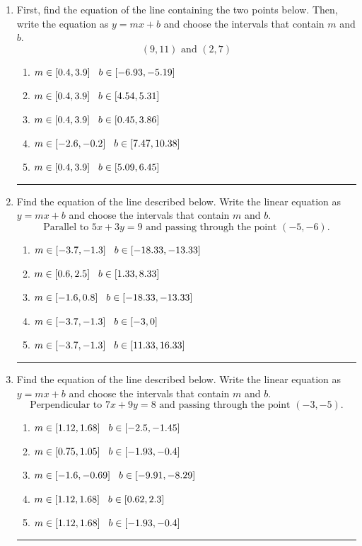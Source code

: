\documentclass[14pt]{extbook}
\newcommand{\litem}[1]{\item#1\hspace*{-1cm}\rule{\textwidth}{0.4pt}}
\begin{document}
\begin{enumerate}
\litem{
First, find the equation of the line containing the two points below. Then, write the equation as $ y=mx+b $ and choose the intervals that contain $m$ and $b$.\[ (9, 11) \text{ and } (2, 7) \]\begin{enumerate}[label=\Alph*.]
\item \( m \in [0.4, 3.9] \hspace*{3mm} b \in [-6.93, -5.19] \)
\item \( m \in [0.4, 3.9] \hspace*{3mm} b \in [4.54, 5.31] \)
\item \( m \in [0.4, 3.9] \hspace*{3mm} b \in [0.45, 3.86] \)
\item \( m \in [-2.6, -0.2] \hspace*{3mm} b \in [7.47, 10.38] \)
\item \( m \in [0.4, 3.9] \hspace*{3mm} b \in [5.09, 6.45] \)

\end{enumerate} }
\litem{
Find the equation of the line described below. Write the linear equation as $ y=mx+b $ and choose the intervals that contain $m$ and $b$.\[ \text{Parallel to } 5 x + 3 y = 9 \text{ and passing through the point } (-5, -6). \]\begin{enumerate}[label=\Alph*.]
\item \( m \in [-3.7, -1.3] \hspace*{3mm} b \in [-18.33, -13.33] \)
\item \( m \in [0.6, 2.5] \hspace*{3mm} b \in [1.33, 8.33] \)
\item \( m \in [-1.6, 0.8] \hspace*{3mm} b \in [-18.33, -13.33] \)
\item \( m \in [-3.7, -1.3] \hspace*{3mm} b \in [-3, 0] \)
\item \( m \in [-3.7, -1.3] \hspace*{3mm} b \in [11.33, 16.33] \)

\end{enumerate} }
\litem{
Find the equation of the line described below. Write the linear equation as $ y=mx+b $ and choose the intervals that contain $m$ and $b$.\[ \text{Perpendicular to } 7 x + 9 y = 8 \text{ and passing through the point } (-3, -5). \]\begin{enumerate}[label=\Alph*.]
\item \( m \in [1.12, 1.68] \hspace*{3mm} b \in [-2.5, -1.45] \)
\item \( m \in [0.75, 1.05] \hspace*{3mm} b \in [-1.93, -0.4] \)
\item \( m \in [-1.6, -0.69] \hspace*{3mm} b \in [-9.91, -8.29] \)
\item \( m \in [1.12, 1.68] \hspace*{3mm} b \in [0.62, 2.3] \)
\item \( m \in [1.12, 1.68] \hspace*{3mm} b \in [-1.93, -0.4] \)


\end{enumerate}}
\end{enumerate}
\end{document}
